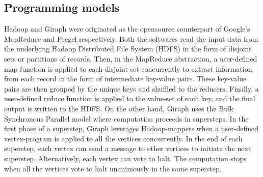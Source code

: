 \documentclass[conference]{IEEEtran}
\begin{document}
\subsection {Programming models}
Hadoop and Giraph were originated as the opensource counterpart of Google's MapReduce \cite{fw:mapreduce} and Pregel \cite{fw:pregel} respectively.
Both the softwares read the input data  from the underlying Hadoop Distributed File System (HDFS) in the form of disjoint sets or partitions of records.
Then, in the MapReduce abstraction, a user-defined map function is applied to each disjoint set concurrently to extract information from each record in the form of intermediate key-value pairs. 
These key-value pairs are then grouped by the unique keys and shuffled to the reducers. 
Finally, a user-defined reduce function is applied to the value-set of each key, and the final output is written to the HDFS.
On the other hand, Giraph uses the Bulk Synchronous Parallel model \cite{fw:bsp} where computation proceeds in supersteps.
In the first phase of a superstep, Giraph leverages Hadoop-mappers when a user-defined vertex-program is applied to all the vertices concurrently.
In the end of each superstep, each vertex can send a message to other vertices to initiate the next superstep.
Alternatively, each vertex can vote to halt. 
The computation stops when all the vertices vote to halt unanimously in the same superstep.

 
\end{document}
